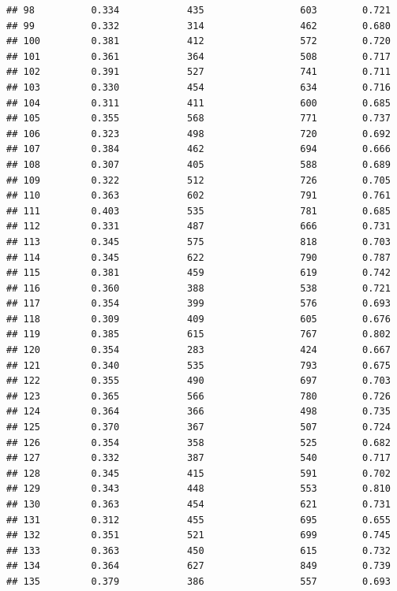 \documentclass[]{book}
\begin{document}
\begin{verbatim}
## 98          0.334            435                 603        0.721
## 99          0.332            314                 462        0.680
## 100         0.381            412                 572        0.720
## 101         0.361            364                 508        0.717
## 102         0.391            527                 741        0.711
## 103         0.330            454                 634        0.716
## 104         0.311            411                 600        0.685
## 105         0.355            568                 771        0.737
## 106         0.323            498                 720        0.692
## 107         0.384            462                 694        0.666
## 108         0.307            405                 588        0.689
## 109         0.322            512                 726        0.705
## 110         0.363            602                 791        0.761
## 111         0.403            535                 781        0.685
## 112         0.331            487                 666        0.731
## 113         0.345            575                 818        0.703
## 114         0.345            622                 790        0.787
## 115         0.381            459                 619        0.742
## 116         0.360            388                 538        0.721
## 117         0.354            399                 576        0.693
## 118         0.309            409                 605        0.676
## 119         0.385            615                 767        0.802
## 120         0.354            283                 424        0.667
## 121         0.340            535                 793        0.675
## 122         0.355            490                 697        0.703
## 123         0.365            566                 780        0.726
## 124         0.364            366                 498        0.735
## 125         0.370            367                 507        0.724
## 126         0.354            358                 525        0.682
## 127         0.332            387                 540        0.717
## 128         0.345            415                 591        0.702
## 129         0.343            448                 553        0.810
## 130         0.363            454                 621        0.731
## 131         0.312            455                 695        0.655
## 132         0.351            521                 699        0.745
## 133         0.363            450                 615        0.732
## 134         0.364            627                 849        0.739
## 135         0.379            386                 557        0.693

\end{verbatim}
\end{document}
